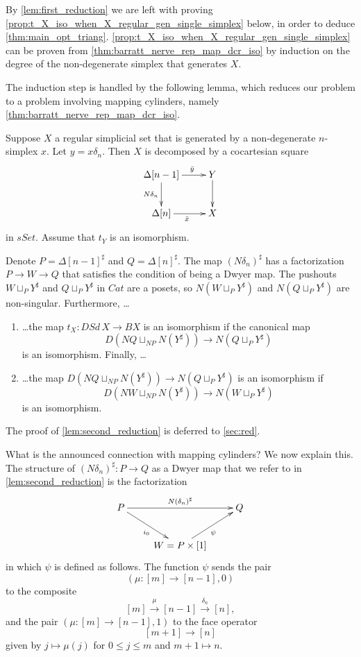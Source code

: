 By \cref{lem:first_reduction} we are left with proving \cref{prop:t_X_iso_when_X_regular_gen_single_simplex} below, in order to deduce \cref{thm:main_opt_triang}. \cref{prop:t_X_iso_when_X_regular_gen_single_simplex} can be proven from \cref{thm:barratt_nerve_rep_map_dcr_iso} by induction on the degree of the non-degenerate simplex that generates $X$.

The induction step is handled by the following lemma, which reduces our problem to a problem involving mapping cylinders, namely \cref{thm:barratt_nerve_rep_map_dcr_iso}.
\begin{lemma}\label{lem:second_reduction}
Suppose $X$ a regular simplicial set that is generated by a non-degenerate $n$-simplex $x$. Let $y=x\delta _n$. Then $X$ is decomposed by a cocartesian square
\begin{displaymath}
\xymatrix{
\Delta [n-1] \ar[d]_{N\delta _n} \ar[r]^(.6){\bar{y} } & Y \ar[d] \\
\Delta [n] \ar[r]_{\bar{x} } & X
}
\end{displaymath}
in $sSet$. Assume that $t_Y$ is an isomorphism.

Denote $P=\Delta [n-1]^\sharp$ and $Q=\Delta [n]^\sharp$. The map $(N\delta _n)^\sharp$ has a factorization $P\to W\to Q$ that satisfies the condition of being a Dwyer map. The pushouts $W\sqcup _PY^\sharp$ and $Q\sqcup _PY^\sharp$ in $Cat$ are a posets, so $N(W\sqcup _PY^\sharp )$ and $N(Q\sqcup _PY^\sharp )$ are non-singular. Furthermore, \dots
\begin{enumerate}
\item{\dots the map $t_X:DSd\, X\to BX$ is an isomorphism if the canonical map
\[D(NQ\sqcup _{NP}N(Y^\sharp ))\to N(Q\sqcup _PY^\sharp )\]
is an isomorphism. Finally, \dots }
\item{\dots the map $D(NQ\sqcup _{NP}N(Y^\sharp ))\to N(Q\sqcup _PY^\sharp )$ is an isomorphism if
\[D(NW\sqcup _{NP}N(Y^\sharp ))\to N(W\sqcup _PY^\sharp )\]
is an isomorphism.}
\end{enumerate}
\end{lemma}
\noindent The proof of \cref{lem:second_reduction} is deferred to \cref{sec:red}.

What is the announced connection with mapping cylinders? We now explain this. The structure of $(N\delta _n)^\sharp :P\to Q$ as a Dwyer map that we refer to in \cref{lem:second_reduction} is the factorization
\begin{equation}
\label{eq:zeroth_diagram_proof_lem_second_reduction}
\begin{gathered}
\xymatrix{
P \ar[dr]_{i_0} \ar[rr]^{N(\delta _n)^\sharp } && Q \\
& W=P\times [1] \ar[ur]_\psi
}
\end{gathered}
\end{equation}
in which $\psi$ is defined as follows. The function $\psi$ sends the pair
\[(\mu :[m]\to [n-1],0)\]
to the composite
\[[m]\xrightarrow{\mu } [n-1]\xrightarrow{\delta _n} [n],\]
and the pair $(\mu :[m]\to [n-1],1)$ to the face operator
\[[m+1]\to [n]\]
given by $j\mapsto \mu (j)$ for $0\leq j\leq m$ and $m+1\mapsto n$.

